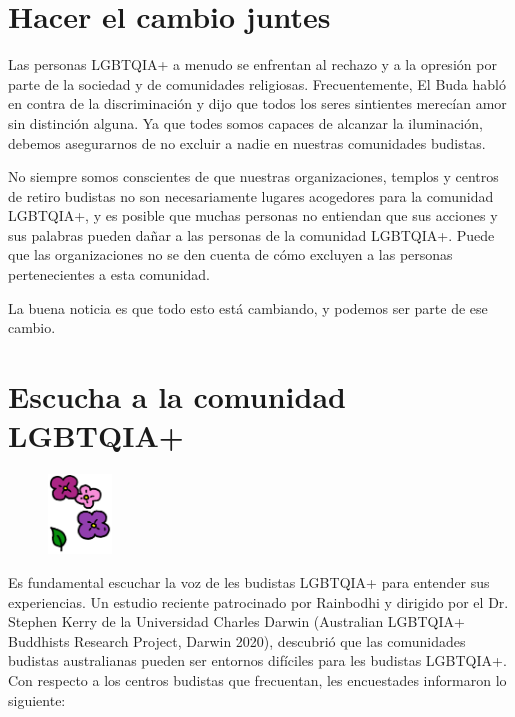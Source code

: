 \documentclass[12pt,openany]{book}
\begin{document}
\section*{Hacer el cambio juntes}

Las personas LGBTQIA+ a menudo se enfrentan al rechazo y a la opresión por parte de la sociedad y de comunidades religiosas.
Frecuentemente, El Buda habló en contra de la discriminación y dijo que todos los seres sintientes merecían amor sin distinción alguna. Ya que todes somos capaces de alcanzar la iluminación, debemos asegurarnos de no excluir a nadie en nuestras comunidades budistas.

No siempre somos conscientes de que nuestras organizaciones, templos y centros de retiro budistas no son necesariamente lugares acogedores para la comunidad LGBTQIA+, y
es posible que muchas personas no entiendan que sus acciones y sus palabras pueden dañar a las personas de la comunidad LGBTQIA+. Puede que las organizaciones no se den cuenta de cómo excluyen a las personas pertenecientes a esta comunidad.

La buena noticia es que todo esto está cambiando, y podemos ser parte de ese cambio.

\section*{Escucha a la comunidad LGBTQIA+}

\begin{figure}
    \centering
    \includegraphics[width=0.15\textwidth]{2c4.png}
\end{figure}

Es fundamental escuchar la voz de les budistas LGBTQIA+ para entender sus experiencias. Un estudio reciente patrocinado por Rainbodhi y dirigido por el Dr. Stephen Kerry de la Universidad Charles Darwin (Australian LGBTQIA+ Buddhists Research Project, Darwin 2020), descubrió que las comunidades budistas australianas pueden ser entornos difíciles para les budistas LGBTQIA+. Con respecto a los centros budistas que frecuentan, les encuestades informaron lo siguiente:
\end{document}
